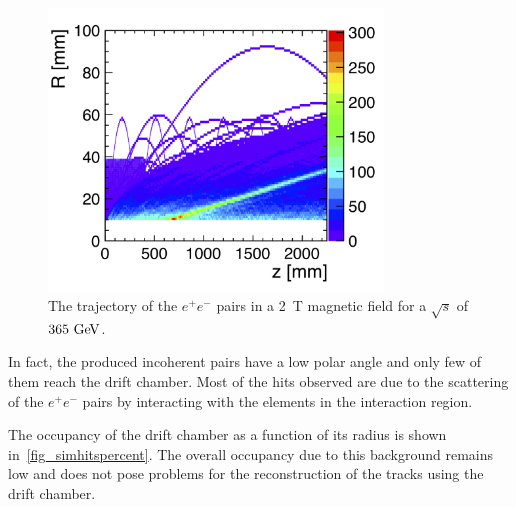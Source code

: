 \documentclass{article}
\begin{document}
\begin{figure}[!t]
\centering
\includegraphics[width=3.5in]{figures/pairs_R_Z.png}
\caption{The trajectory of the $e^+e^-$ pairs in a 2~T magnetic field for a $\sqrt{s}$ of $365\,\mathrm{\,Ge\kern -0.1em V}$.}
\label{fig_pairbcg}
\end{figure}

In fact, the produced incoherent pairs have a low polar angle and only few of them reach the drift chamber. Most of the hits observed are due to the scattering of the $e^+e^-$ pairs by interacting with the elements in the interaction region.


The occupancy of the drift chamber as a function of its radius is shown in~\cref{fig_simhitspercent}. The overall occupancy due to this background remains low and does not pose problems for the reconstruction of the tracks using the drift chamber.
\end{document}
